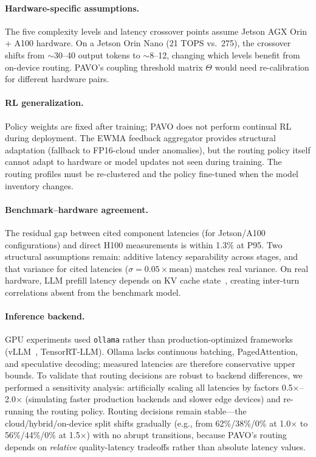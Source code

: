\documentclass{article}
\begin{document}
\paragraph{Hardware-specific assumptions.} The five complexity levels and latency crossover points assume Jetson AGX Orin + A100 hardware. On a Jetson Orin Nano (21 TOPS vs.\ 275), the crossover shifts from $\sim$30--40 output tokens to $\sim$8--12, changing which levels benefit from on-device routing. PAVO's coupling threshold matrix $\Theta$ would need re-calibration for different hardware pairs.

\paragraph{RL generalization.} Policy weights are fixed after training; PAVO does not perform continual RL during deployment. The EWMA feedback aggregator provides structural adaptation (fallback to FP16-cloud under anomalies), but the routing policy itself cannot adapt to hardware or model updates not seen during training. The routing profiles must be re-clustered and the policy fine-tuned when the model inventory changes.

\paragraph{Benchmark--hardware agreement.} The residual gap between cited component latencies (for Jetson/A100 configurations) and direct H100 measurements is within 1.3\% at P95. Two structural assumptions remain: additive latency separability across stages, and that variance for cited latencies ($\sigma = 0.05 \times \text{mean}$) matches real variance. On real hardware, LLM prefill latency depends on KV cache state~\citep{kwon2023vllm}, creating inter-turn correlations absent from the benchmark model.

\paragraph{Inference backend.} GPU experiments used \texttt{ollama} rather than production-optimized frameworks (vLLM~\citep{kwon2023vllm}, TensorRT-LLM). Ollama lacks continuous batching, PagedAttention, and speculative decoding; measured latencies are therefore conservative upper bounds. To validate that routing decisions are robust to backend differences, we performed a sensitivity analysis: artificially scaling all latencies by factors 0.5$\times$--2.0$\times$ (simulating faster production backends and slower edge devices) and re-running the routing policy. Routing decisions remain stable---the cloud/hybrid/on-device split shifts gradually (e.g., from 62\%/38\%/0\% at 1.0$\times$ to 56\%/44\%/0\% at 1.5$\times$) with no abrupt transitions, because PAVO's routing depends on \emph{relative} quality-latency tradeoffs rather than absolute latency values.
\end{document}
